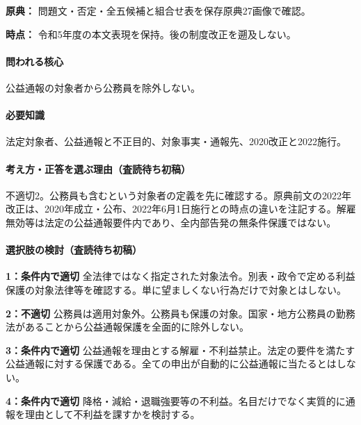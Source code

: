 \noindent\textbf{原典：} 問題文・否定・全五候補と組合せ表を保存原典27画像で確認。\par

\noindent\textbf{時点：} 令和5年度の本文表現を保持。後の制度改正を遡及しない。\par

\paragraph{問われる核心} 公益通報の対象者から公務員を除外しない。

\paragraph{必要知識} 法定対象者、公益通報と不正目的、対象事実・通報先、2020改正と2022施行。

\paragraph{考え方・正答を選ぶ理由（査読待ち初稿）} 不適切2。公務員も含むという対象者の定義を先に確認する。原典前文の2022年改正は、2020年成立・公布、2022年6月1日施行との時点の違いを注記する。解雇無効等は法定の公益通報要件内であり、全内部告発の無条件保護ではない。

\paragraph{選択肢の検討（査読待ち初稿）}\mbox{}\par

\noindent\textbf{1：条件内で適切} 全法律ではなく指定された対象法令。別表・政令で定める利益保護の対象法律等を確認する。単に望ましくない行為だけで対象とはしない。\par

\noindent\textbf{2：不適切} 公務員は適用対象外。公務員も保護の対象。国家・地方公務員の勤務法があることから公益通報保護を全面的に除外しない。\par

\noindent\textbf{3：条件内で適切} 公益通報を理由とする解雇・不利益禁止。法定の要件を満たす公益通報に対する保護である。全ての申出が自動的に公益通報に当たるとはしない。\par

\noindent\textbf{4：条件内で適切} 降格・減給・退職強要等の不利益。名目だけでなく実質的に通報を理由として不利益を課すかを検討する。\par

